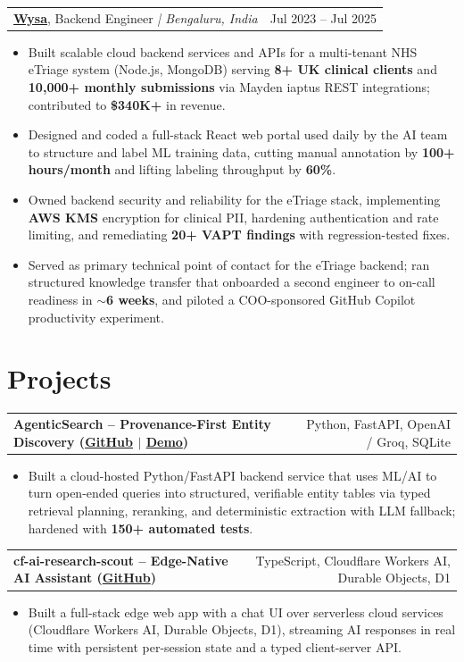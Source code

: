 \documentclass[letterpaper,11pt]{article}
\makeatletter
\newcommand{\expItem}[4]{%
  \vspace{2pt}
  \begin{tabular*}{\textwidth}{@{}l@{\extracolsep{\fill}}r@{}}
    \textbf{#1}, #2 \textit{| #3} & #4 \\
  \end{tabular*}\par\vspace{-3pt}
}
\newcommand{\projItem}[2]{%
  \vspace{2pt}
  \begin{tabular*}{\textwidth}{@{}l@{\extracolsep{\fill}}r@{}}
    \textbf{#1} & #2 \\
  \end{tabular*}\par\vspace{-3pt}
}
\makeatother
\begin{document}
\expItem{\href{https://www.wysa.io}{Wysa}}{Backend Engineer}{Bengaluru, India}{Jul 2023 -- Jul 2025}
\begin{itemize}
  \item Built scalable cloud backend services and APIs for a multi-tenant NHS eTriage system (Node.js, MongoDB) serving \textbf{8+ UK clinical clients} and \textbf{10{,}000+ monthly submissions} via Mayden iaptus REST integrations; contributed to \textbf{\$340K+} in revenue.
  \item Designed and coded a full-stack React web portal used daily by the AI team to structure and label ML training data, cutting manual annotation by \textbf{100+ hours/month} and lifting labeling throughput by \textbf{60\%}.
  \item Owned backend security and reliability for the eTriage stack, implementing \textbf{AWS KMS} encryption for clinical PII, hardening authentication and rate limiting, and remediating \textbf{20+ VAPT findings} with regression-tested fixes.
  \item Served as primary technical point of contact for the eTriage backend; ran structured knowledge transfer that onboarded a second engineer to on-call readiness in \textbf{$\sim$6 weeks}, and piloted a COO-sponsored GitHub Copilot productivity experiment.
\end{itemize}

\section{Projects}

\projItem{AgenticSearch -- Provenance-First Entity Discovery {\normalfont\small(\href{https://github.com/Deva-1903/ciir_agentic_search}{GitHub} $\vert$ \href{https://agentic-search-negglszkwa-uc.a.run.app}{Demo})}}{Python, FastAPI, OpenAI / Groq, SQLite}
\begin{itemize}
  \item Built a cloud-hosted Python/FastAPI backend service that uses ML/AI to turn open-ended queries into structured, verifiable entity tables via typed retrieval planning, reranking, and deterministic extraction with LLM fallback; hardened with \textbf{150+ automated tests}.
\end{itemize}

\projItem{cf-ai-research-scout -- Edge-Native AI Assistant {\normalfont\small(\href{https://github.com/Deva-1903/cf_ai_research_scout}{GitHub})}}{TypeScript, Cloudflare Workers AI, Durable Objects, D1}
\begin{itemize}
  \item Built a full-stack edge web app with a chat UI over serverless cloud services (Cloudflare Workers AI, Durable Objects, D1), streaming AI responses in real time with persistent per-session state and a typed client-server API.
\end{itemize}
\end{document}

